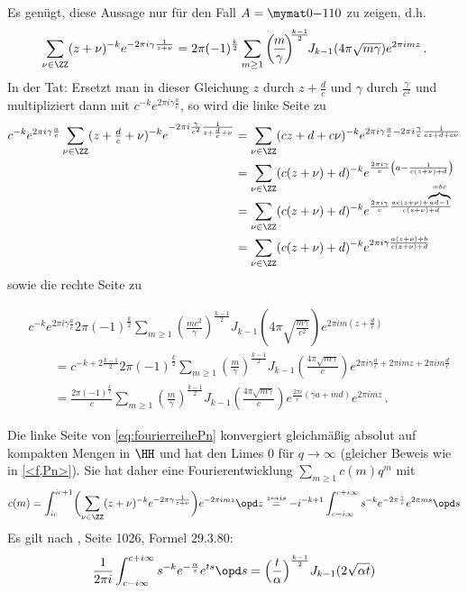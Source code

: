 \begin{bewe}
\begin{bewe}
Es genügt, diese Aussage nur für den Fall $A = \mymat 0{-1}10$ zu zeigen, d.h.
\[
	\sum_{\nu \in \ZZ} (z + \nu)^{-k} e^{-2\pi i\gamma \frac{1}{z+\nu}} = 2\pi (-1)^{\frac k2} \sum_{m \geq 1} \left(\!\frac m\gamma\!\right)^{\!\!\frac{k-1}2} \!\! J_{k-1}(4\pi\sqrt{m\gamma}) e^{2\pi imz}
	\,.
\]
In der Tat: Ersetzt man in dieser Gleichung $z$ durch $z + \frac dc$ und $\gamma$ durch $\frac{\gamma}{c^2}$ und multipliziert dann mit $c^{-k} e^{2\pi i \gamma \frac ac}$, so wird die linke Seite zu
\begin{align*}
	c^{-k} e^{2\pi i\gamma \frac ac} \sum_{\nu \in \ZZ} (z + \tfrac dc + \nu)^{-k} e^{-2\pi i \frac{\gamma}{c^2} \frac{1}{z + \frac dc + \nu}} 
	&= \sum_{\nu \in \ZZ} (cz + d + c\nu)^{-k} e^{2\pi i\gamma \frac ac - 2\pi i \frac{\gamma}{c} \frac{1}{cz + d + c\nu}} \\
	&= \sum_{\nu \in \ZZ} (c(z + \nu) + d)^{-k} e^{\frac{2\pi i\gamma}c \left( a - \frac{1}{c(z + \nu) + d} \right)} \\[-12pt]
	&= \sum_{\nu \in \ZZ} (c(z + \nu) + d)^{-k} e^{\frac{2\pi i\gamma}c \frac{ac(z + \nu) + \overbrace{\scriptscriptstyle ad - 1}^{= bc}}{c(z + \nu) + d}} \\
	&= \sum_{\nu \in \ZZ} (c(z + \nu) + d)^{-k} e^{2\pi i\gamma \frac{a(z + \nu) + b}{c(z + \nu) + d}} \\
\end{align*}
sowie die rechte Seite zu

\begin{align}\label{eq:fourierreihePn}
	&c^{-k} e^{2\pi i \gamma \frac ac} 2\pi (-1)^{\frac k2} \sum_{m\geq 1} \left(\!\frac {mc^2}{\gamma}\right)^{\!\!\frac {k-1}2} \!\! J_{k-1} \left(\! 4\pi \sqrt{\frac{m\gamma}{c^2}}\right) e^{2\pi i m(z + \frac dc)} \\
	&\qquad = c^{-k+2\frac{k-1}2} 2\pi (-1)^{\frac k2} \sum_{m\geq 1} \left(\!\frac {m}{\gamma}\!\right)^{\!\!\frac {k-1}2} \!\! J_{k-1} \left(\! \tfrac{4\pi \sqrt{m\gamma}}c\right) e^{2\pi i \gamma \frac ac + 2\pi i mz + 2\pi im\frac dc} \nonumber \\
	&\qquad = \frac{2\pi (-1)^{\frac k2}}c \sum_{m\geq 1} \left(\!\frac {m}{\gamma}\!\right)^{\!\!\frac {k-1}2} \!\! J_{k-1} \left(\! \tfrac{4\pi \sqrt{m\gamma}}c\right) e^{\frac{2\pi i}c \left(\gamma a + md\right)} e^{2\pi i mz} \nonumber
	\,.
\end{align}


Die linke Seite von \eqref{eq:fourierreihePn} konvergiert gleichmäßig absolut auf kompakten Mengen in $\HH$ und hat den Limes 0 für $q\to \infty$ (gleicher Beweis wie in \autoref{<f,Pn>}).
Sie hat daher eine Fourierentwicklung $\sum_{m\geq 1} c(m) q^m$ mit
\[
	c(m) = \int_{ic}^{ic+1} \biggl( \sum_{\nu \in \ZZ} (z+\nu)^{-k} e^{-2\pi \gamma \frac{1}{z+\nu}} \biggr) e^{-2\pi imz} \opd z
	\stackrel{z \mapsto is}{=} -i^{-k+1} \int_{c-i \infty}^{c + i\infty} s^{-k} e^{-2\pi \frac{\gamma}{s}} e^{2\pi ms} \opd s
\]
Es gilt nach , Seite 1026, Formel 29.3.80:
\[
	\frac{1}{2\pi i} \int_{c-i\infty}^{c+i\infty} s^{-k} e^{-\frac{\alpha}{s}} e^{ts} \opd s = \Bigl(\frac{t}{\alpha}\Bigr)^{\frac{k-1}{2}} J_{k-1}(2\sqrt{\alpha t})
\]


\end{bewe}
\end{bewe}
